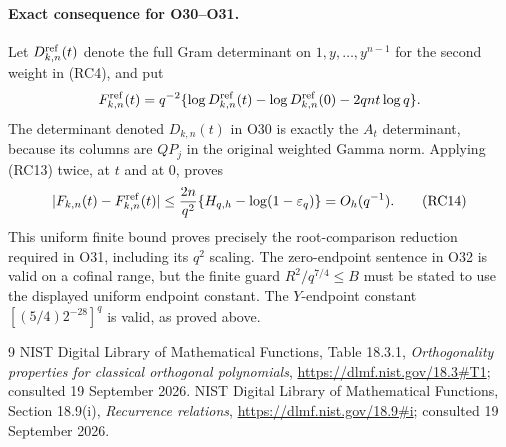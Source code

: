 \documentclass[11pt]{article}
\begin{document}
\paragraph{Exact consequence for O30--O31.}
Let $D^{\rm ref}_{k,n}(t)$ denote the full Gram determinant on
$1,y,\ldots,y^{n-1}$ for the second weight in (RC4), and put
\[
 F^{\rm ref}_{k,n}(t)=q^{-2}
  \{\log D^{\rm ref}_{k,n}(t)-\log D^{\rm ref}_{k,n}(0)
                                   -2qnt\log q\}.
\]
The determinant denoted $D_{k,n}(t)$ in O30 is exactly the
$A_t$ determinant, because its columns are $QP_j$ in the original
weighted Gamma norm.
Applying (RC13) twice, at $t$ and at $0$, proves
\[
 |F_{k,n}(t)-F^{\rm ref}_{k,n}(t)|
 \leq\frac{2n}{q^2}
          \{H_{q,h}-\log(1-\varepsilon_q)\}
 =O_h(q^{-1}).                                  \tag{RC14}
\]
This uniform finite bound proves precisely the root-comparison
reduction required in O31, including its $q^2$ scaling.
The zero-endpoint sentence in O32 is valid on a cofinal range, but the
finite guard $R^2/q^{7/4}\leq B$ must be stated to use the displayed
uniform endpoint constant. The $Y$-endpoint constant
$[(5/4)2^{-28}]^q$ is valid, as proved above.

\begin{thebibliography}{9}
NIST Digital Library of Mathematical Functions, Table 18.3.1,
\textit{Orthogonality properties for classical orthogonal polynomials},
\url{https://dlmf.nist.gov/18.3#T1}; consulted 19 September 2026.
NIST Digital Library of Mathematical Functions, Section 18.9(i),
\textit{Recurrence relations},
\url{https://dlmf.nist.gov/18.9#i}; consulted 19 September 2026.
\end{thebibliography}
\end{document}
